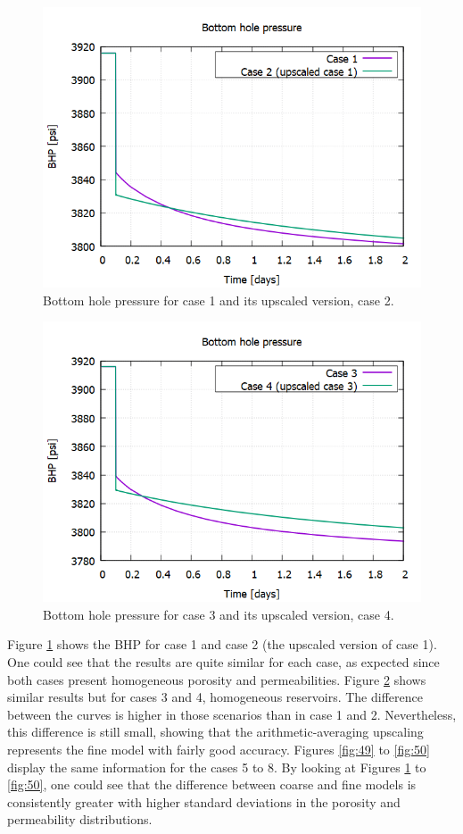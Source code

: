 \begin{figure}[H]
	\centering
	\includegraphics[width=0.8\linewidth]{Images/47}
	\caption{Bottom hole pressure for case 1 and its upscaled version, case 2.}
	\label{fig:47}
\end{figure}

\begin{figure}[H]
	\centering
	\includegraphics[width=0.8\linewidth]{Images/48}
	\caption{Bottom hole pressure for case 3 and its upscaled version, case 4.}
	\label{fig:48}
\end{figure}

Figure \ref{fig:47} shows the BHP for case 1 and case 2 (the upscaled version of case 1). One could see that the results are quite similar for each case, as expected since both cases present homogeneous porosity and permeabilities. Figure \ref{fig:48} shows similar results but for cases 3 and 4, homogeneous reservoirs. The difference between the curves is higher in those scenarios than in case 1 and 2. Nevertheless, this difference is still small, showing that the arithmetic-averaging upscaling represents the fine model with fairly good accuracy. Figures \ref{fig:49} to \ref{fig:50} display the same information for the cases 5 to 8. By looking at Figures \ref{fig:47} to \ref{fig:50}, one could see that the difference between coarse and fine models is consistently greater with higher standard deviations in the porosity and permeability distributions. 


